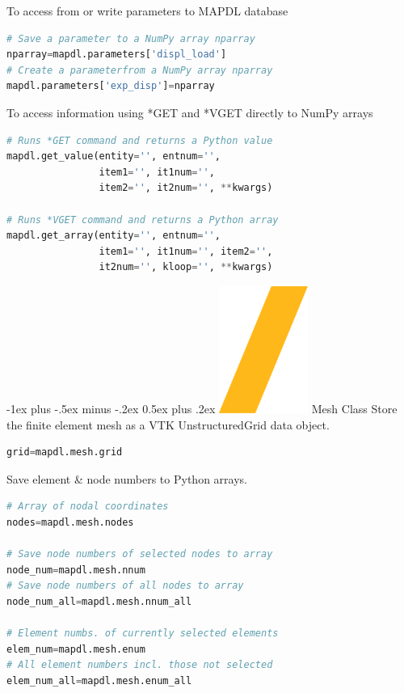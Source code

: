 \documentclass[9pt,landscape]{article}
\makeatletter
\renewcommand{\section}{\@startsection{section}{1}{0mm}%
                                {-1ex plus -.5ex minus -.2ex}%
                                {0.5ex plus .2ex}%
                                {\normalfont\large\bfseries}}
\def\code#1{\textit{}{#1}}
\makeatother
\begin{document}
\begin{multicols}{3}
To access from or write parameters to MAPDL database
\begin{lstlisting}[language=Python]
# Save a parameter to a NumPy array nparray
nparray=mapdl.parameters['displ_load']
# Create a parameterfrom a NumPy array nparray
mapdl.parameters['exp_disp']=nparray
\end{lstlisting} 

To access information using \code{*GET} and \code{*VGET} directly to NumPy arrays
\begin{lstlisting}[language=Python]
# Runs *GET command and returns a Python value
mapdl.get_value(entity='', entnum='',
                item1='', it1num='',
                item2='', it2num='', **kwargs)

# Runs *VGET command and returns a Python array
mapdl.get_array(entity='', entnum='',
                item1='', it1num='', item2='',
                it2num='', kloop='', **kwargs)
\end{lstlisting} 

\section{\includegraphics[height=\fontcharht\font`\S]{slash.png} Mesh Class}
Store the finite element mesh as a VTK UnstructuredGrid data object.
\begin{lstlisting}[language=Python]
grid=mapdl.mesh.grid
\end{lstlisting} 

Save element \& node numbers to Python arrays.
\begin{lstlisting}[language=Python]
# Array of nodal coordinates
nodes=mapdl.mesh.nodes

# Save node numbers of selected nodes to array
node_num=mapdl.mesh.nnum
# Save node numbers of all nodes to array
node_num_all=mapdl.mesh.nnum_all

# Element numbs. of currently selected elements
elem_num=mapdl.mesh.enum
# All element numbers incl. those not selected
elem_num_all=mapdl.mesh.enum_all
\end{lstlisting} 
\vfill


\end{multicols}
\end{document}
